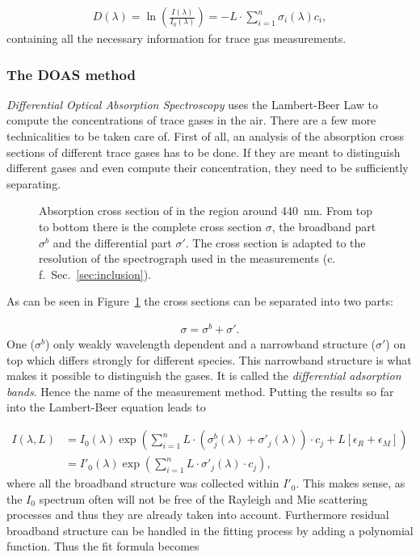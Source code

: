 \begin{align*}
  D(\lambda) = \ln \left(\frac{I(\lambda)}{I_0(\lambda)}\right) = - L
  \cdot \sum_{i=1}^n \sigma_i(\lambda) c_i,
\end{align*}
containing all the necessary information for trace gas measurements.

\subsubsection{The DOAS method}
\label{sec:doas}

\emph{Differential Optical Absorption Spectroscopy} uses the
Lambert-Beer Law to compute the concentrations of trace gases in the
air. There are a few more technicalities to be taken care of. First of
all, an analysis of the absorption cross sections of different trace
gases has to be done. If they are meant to distinguish different gases
and even compute their concentration, they need to be sufficiently
separating.

\begin{figure}[htbp]
  \centering
  
  \caption{Absorption cross section of  in the region around
    \SI{440}{\nano\meter}. From top to bottom there is the complete
    cross section $\sigma$, the broadband part $\sigma^b$ and the
    differential part $\sigma'$. The cross section is adapted to the
    resolution of the spectrograph used in the measurements
    (c.\,f.\ Sec.~\ref{sec:inclusion}).}
  \label{fig:no2-cross}
\end{figure}

As can be seen in Figure~\ref{fig:no2-cross} the
cross sections can be separated into two parts: 

\begin{align*}
  \sigma = \sigma^b + \sigma'.
\end{align*}
One ($\sigma^b$) only weakly wavelength dependent and a narrowband
structure ($\sigma'$) on top which differs strongly for different
species. This narrowband structure is what makes it possible to
distinguish the gases. It is called the \emph{differential adsorption
  bands}. Hence the name of the measurement method. Putting the
results so far into the Lambert-Beer equation leads to

\begin{align*}
  I(\lambda, L) & = I_0(\lambda) \exp \left ( \sum_{i=1}^n L \cdot
                  (\sigma^b_j(\lambda) + \sigma'_j(\lambda))\cdot c_j + L[\epsilon_R +
                  \epsilon_M]\right) \\
                & = I'_0(\lambda) \exp \left( \sum_{i=1}^n L \cdot
                  \sigma'_j(\lambda) \cdot c_j \right),
\end{align*}
where all the broadband structure was collected within $I'_0$. This
makes sense, as the $I_0$ spectrum often will not be free of the Rayleigh
and Mie scattering processes and thus they are already taken into
account. Furthermore residual broadband structure can be handled in
the fitting process by adding a polynomial function. Thus the fit
formula becomes

